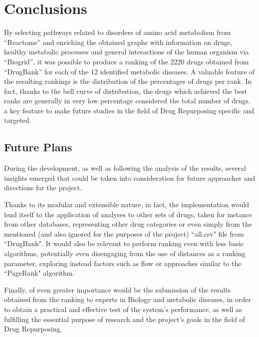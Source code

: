 \chapter{Conclusions}\label{chap:conclusions}

By selecting pathways related to disorders of amino acid metabolism from ``Reactome'' and enriching the obtained graphs with information on drugs, healthy metabolic processes and general interactions of the human organism via ``Biogrid'', it was possible to produce a ranking of the 2220 drugs obtained from ``DrugBank'' for each of the 12 identified metabolic diseases. 
A valuable feature of the resulting rankings is the distribution of the percentages of drugs per rank. In fact, thanks to the bell curve of distribution, the drugs which achieved the best ranks are generally in very low percentage considered the total number of drugs. a key feature to make future studies in the field of Drug Repurposing specific and targeted.

\section{Future Plans}
During the development, as well as following the analysis of the results, several insights emerged that could be taken into consideration for future approaches and directions for the project.

Thanks to its modular and extensible nature, in fact, the implementation would lend itself to the application of analyses to other sets of drugs, taken for instance from other databases, representing other drug categories or even simply from the mentioned (and also ignored for the purposes of the project) ``all.csv" file from ``DrugBank". It would also be relevant to perform ranking even with less basic algorithms, potentially even disengaging from the use of distances as a ranking parameter, exploring instead factors such as flow or approaches similar to the ``PageRank" algorithm.

Finally, of even greater importance would be the submission of the results obtained from the ranking to experts in Biology and metabolic diseases, in order to obtain a practical and effective test of the system's performance, as well as fulfilling the essential purpose of research and the project's goals in the field of Drug Repurposing.